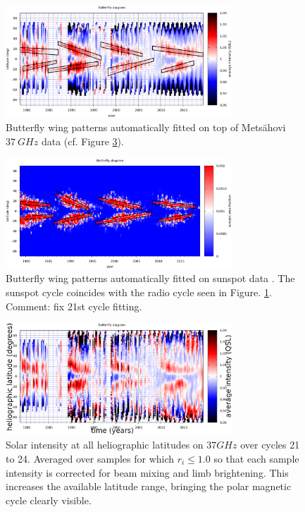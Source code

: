 \documentclass{aa}
\begin{document}
\begin{figure}
\centering
\includegraphics[width=8.5cm]{butterfly_wingfit_raw.png}
\caption{Butterfly wing patterns automatically fitted on top of Mets\"ahovi $\SI{37}{GHz}$ data (cf. Figure \ref{butterfly_clear_corr}).} 
\label{butterfly_wingfit_raw}
\end{figure}

\begin{figure}
\centering
\includegraphics[width=8.5cm]{butterfly_wingfit_sunspot.png}
\caption{Butterfly wing patterns automatically fitted on sunspot data \cite{SUNSPOTDATA:1}. The sunspot cycle coincides with the radio cycle seen in Figure. \ref{butterfly_wingfit_raw}. Comment: fix 21st cycle fitting.}
\label{butterfly_wingfit_sunspot}
\end{figure}

\begin{figure}
\centering
\includegraphics[width=8.5cm]{butterfly_clear_limb.png}
\caption{Solar intensity at all heliographic latitudes on $\si{37}{GHz}$ over cycles 21 to 24. Averaged over samples for which $r_i \le 1.0$ so that each sample intensity is corrected for beam mixing and limb brightening. This increases the available latitude range, bringing the polar magnetic cycle clearly visible.}
\label{butterfly_clear_corr}
\end{figure}
\end{document}
